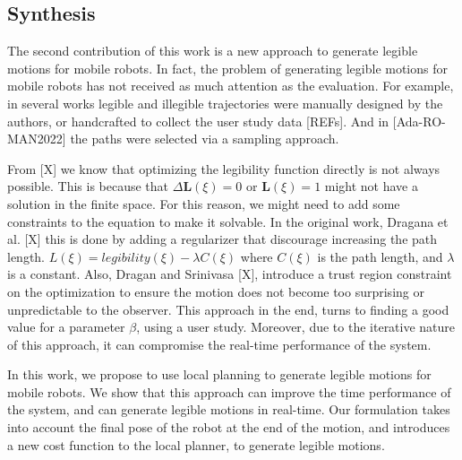     \noindent
    \subsection{Synthesis} %
    The second contribution of this work is a new approach to generate legible motions for mobile robots.
    In fact, the problem of generating legible motions for mobile robots has not received as much attention as the evaluation.
    For example, in several works legible and illegible trajectories were manually designed by the authors,
    or handcrafted to collect the user study data [REFs].
    And in [Ada-RO-MAN2022] the paths were selected via a sampling approach.

    From [X] we know that optimizing the legibility function directly is not always possible.
    This is because that $\Delta \mathbf{L}(\xi) = 0$ or $\mathbf{L}(\xi) = 1$ might not have a solution in the finite space.
    For this reason, we might need to add some constraints to the equation to make it solvable.
    In the original work, Dragana et al. [X] this is done by adding a regularizer that discourage increasing the path length.
    $L(\xi) = legibility(\xi) - \lambda C(\xi)$
    where $C(\xi)$ is the path length, and $\lambda$ is a constant.
    Also, Dragan and Srinivasa [X], introduce a trust region constraint on the optimization
     to ensure the motion does not become too surprising or unpredictable to the observer.
    This approach in the end, turns to finding a good value for a parameter $\beta$, using a user study.
    Moreover, due to the iterative nature of this approach, it can compromise the real-time performance of the system.

    In this work, we propose to use local planning to generate legible motions for mobile robots.
    We show that this approach can improve the time performance of the system, and can generate legible motions in real-time.
    Our formulation takes into account the final pose of the robot at the end of the motion,
    and introduces a new cost function to the local planner, to generate legible motions.



%


